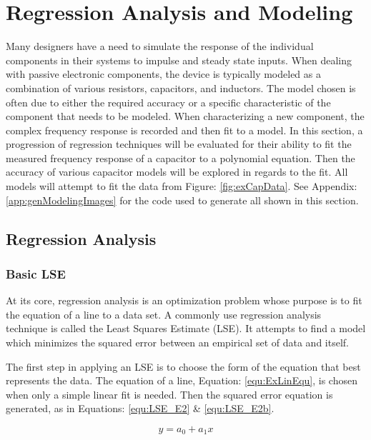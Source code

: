 \section {Regression Analysis and Modeling}
\label{sec:regression}

Many designers have a need to simulate the response of the individual components in their systems to impulse and steady state inputs. When dealing with passive electronic components, the device is typically modeled as a combination of various resistors, capacitors, and inductors. The model chosen is often due to either the required accuracy or a specific characteristic of the component that needs to be modeled. When characterizing a new component, the complex frequency response is recorded and then fit to a model. In this section, a progression of regression techniques will be evaluated for their ability to fit the measured frequency response of a capacitor to a polynomial equation. Then the accuracy of various capacitor models will be explored in regards to the fit. All models will attempt to fit the data from Figure: \ref{fig:exCapData}. See Appendix: \ref{app:genModelingImages} for the code used to generate all shown in this section.



\subsection{Regression Analysis}
\label{sec:RegressionAnalysis}
\subsubsection{Basic LSE}
At its core, regression analysis is an optimization problem whose purpose is to fit the equation of a line to a data set. A commonly use regression analysis technique is called the Least Squares Estimate (LSE). It attempts to find a model which minimizes the squared error between an empirical set of data and itself.

The first step in applying an LSE is to choose the form of the equation that best represents the data. The equation of a line, Equation: \eqref{equ:ExLinEqu}, is chosen when only a simple linear fit is needed.
Then the squared error equation is generated, as in Equations: \eqref{equ:LSE_E2} \& \eqref{equ:LSE_E2b}.

\begin{equation}
    \label{equ:ExLinEqu}
    y = a_0 + a_1 x
\end{equation}

